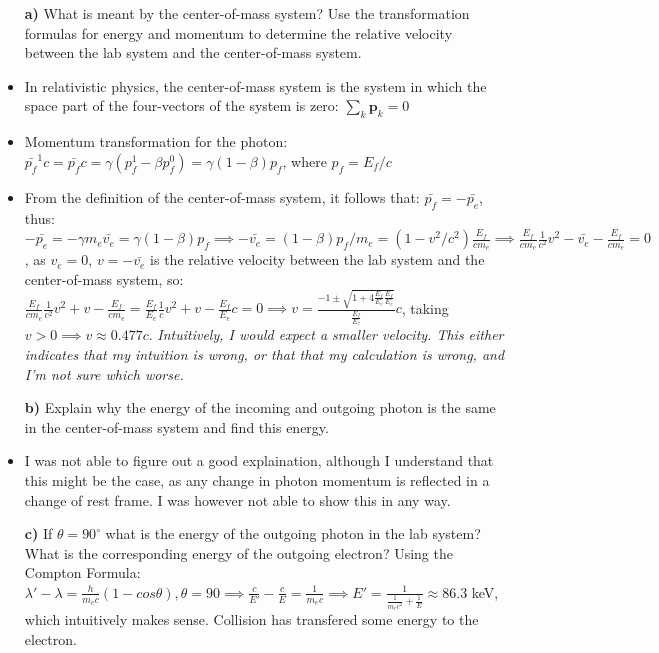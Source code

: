\documentclass[11pt,a4paper]{report}
\newcounter{excount}[chapter]
\newenvironment{exercise}[1][]{\addtocounter{excount}{1} \noindent {\bf Problem
    \arabic{excount} \ \ #1}\hspace{2mm}}{\vspace{4mm}}
\begin{document}
\begin{exercise}[Exam 2005]
\begin{itemize}
\item[\bf a)] What is meant by the center-of-mass system? Use the transformation formulas for energy and momentum to determine the relative velocity between the lab system and the center-of-mass system.
\item In relativistic physics, the center-of-mass system is the system in which the space part of the four-vectors of the system is zero: $\sum_k \mathbf{p}_k=0$
\item Momentum transformation for the photon: $\bar{p_f}^1 c=\bar{p_f}c=\gamma(p_f^1-\beta p_f^0)=\gamma(1-\beta)p_f$, where $p_f=E_f/c$
\item From the definition of the center-of-mass system, it follows that: $\bar{p_f}=-\bar{p_e}$, thus: $-\bar{p_e}=-\gamma m_e \bar{v_e}=\gamma(1-\beta)p_f \implies -\bar{v_e}=(1-\beta)p_f/m_e=(1-v^2/c^2)\frac{E_f}{c m_e } \implies \frac{E_f}{c m_e } \frac{1}{c^2} v^2 - \bar{v_e} -\frac{E_f}{c m_e }=0$, as $v_e=0$, $v=-\bar{v_e}$ is the relative velocity between the lab system and the center-of-mass system, so: $\frac{E_f}{c m_e } \frac{1}{c^2} v^2 +v -\frac{E_f}{c m_e }=\frac{E_f}{E_e} \frac{1}{c} v^2 +v -\frac{E_f}{E_e}c=0 \implies v=\frac{-1\pm \sqrt{1+4\frac{E_f}{E_e}\frac{E_f}{E_e}}}{\frac{E_f}{E_e}} c$, taking $v>0 \implies v\approx0.477c$. \textit{Intuitively, I would expect a smaller velocity. This either indicates that my intuition is wrong, or that that my calculation is wrong, and I'm not sure which worse.}


\item[\bf b)] Explain why the energy of the incoming and outgoing photon is the same in the center-of-mass system and find this energy.
\item I was not able to figure out a good explaination, although I understand that this might be the case, as any change in photon momentum is reflected in a change of rest frame. I was however not able to show this in any way. 
\item[\bf c)] If $\theta=90^{\circ}$ what is the energy of the outgoing photon in the lab system? What is the corresponding energy of the outgoing electron?
Using the Compton Formula:
$\lambda'-\lambda=\frac{h}{m_ec}(1-cos \theta), \theta=90 \implies \frac{c}{E'}-\frac{c}{E}=\frac{1}{m_e c} \implies E'=\frac{1}{\frac{1}{m_e c^2}+\frac{1}{E}}\approx 86.3$ keV, which intuitively makes sense. Collision has transfered some energy to the electron.
\end{itemize}
\end{exercise}


\end{document}
